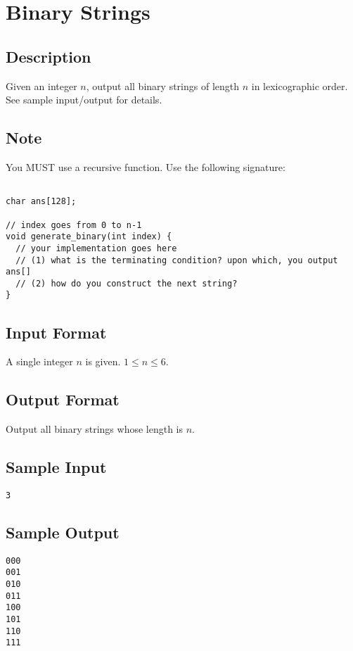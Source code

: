 

\begin{center}\end{center}
\vspace{5mm}


\section{Binary Strings}

\subsection*{Description}
Given an integer $n$, output all binary strings of length $n$ in lexicographic order. See sample input/output for details.

\subsection*{Note}
You MUST use a recursive function. Use the following signature:
\begin{verbatim}

char ans[128];

// index goes from 0 to n-1
void generate_binary(int index) {
  // your implementation goes here
  // (1) what is the terminating condition? upon which, you output ans[]
  // (2) how do you construct the next string?
}
\end{verbatim}

\subsection*{Input Format}
A single integer $n$ is given. $1\leq n \leq 6$. 

\subsection*{Output Format}
Output all binary strings whose length is $n$. 

\subsection*{Sample Input}
\begin{verbatim}
3
\end{verbatim}

\subsection*{Sample Output}
\begin{verbatim}
000
001
010
011
100
101
110
111
\end{verbatim}


